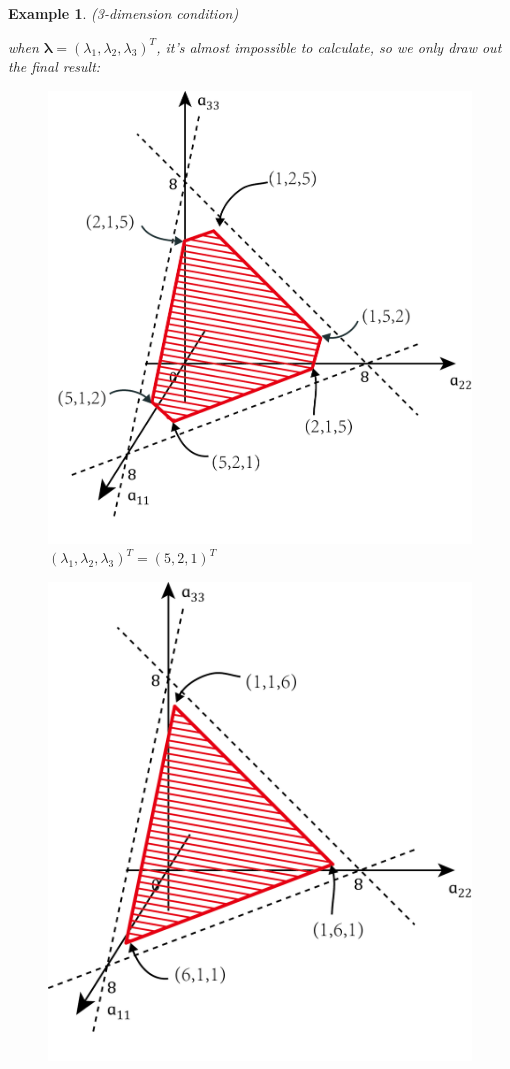 \documentclass[11pt]{amsart}
\numberwithin{equation}{section}
\theoremstyle{plain}
\newtheorem{eg}[theorem]{Example}
\theoremstyle{plain}
\numberwithin{equation}{section}
\theoremstyle{remark}
\begin{document}
\begin{eg}(3-dimension condition)

	when $\bm{\lambda} =(\lambda_1,\lambda_2,\lambda_3)^T$, it's almost impossible to calculate, so we only draw out the final result:
	  	\begin{figure}[H]
	 	\begin{minipage}[t]{.49\textwidth}
	 		\centering
	 		\includegraphics[width=.95\textwidth]{figures/figure4.png}\\
	 		$(\lambda_1,\lambda_2,\lambda_3)^T=(5,2,1)^T$
	 	\end{minipage}
	 	\begin{minipage}[t]{.49\textwidth}
	 		\centering
	 		\includegraphics[width=.95\textwidth]{figures/figure3.png}\\

\end{minipage}
\end{figure}
\end{eg}
\end{document}
